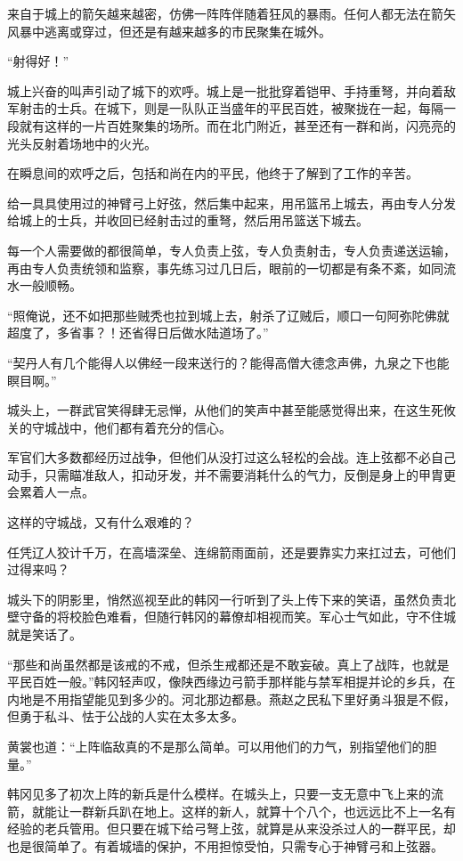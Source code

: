 来自于城上的箭矢越来越密，仿佛一阵阵伴随着狂风的暴雨。任何人都无法在箭矢风暴中逃离或穿过，但还是有越来越多的市民聚集在城外。

“射得好！”

城上兴奋的叫声引动了城下的欢呼。城上是一批批穿着铠甲、手持重弩，并向着敌军射击的士兵。在城下，则是一队队正当盛年的平民百姓，被聚拢在一起，每隔一段就有这样的一片百姓聚集的场所。而在北门附近，甚至还有一群和尚，闪亮亮的光头反射着场地中的火光。

在瞬息间的欢呼之后，包括和尚在内的平民，他终于了解到了工作的辛苦。

给一具具使用过的神臂弓上好弦，然后集中起来，用吊篮吊上城去，再由专人分发给城上的士兵，并收回已经射击过的重弩，然后用吊篮送下城去。

每一个人需要做的都很简单，专人负责上弦，专人负责射击，专人负责递送运输，再由专人负责统领和监察，事先练习过几日后，眼前的一切都是有条不紊，如同流水一般顺畅。

“照俺说，还不如把那些贼秃也拉到城上去，射杀了辽贼后，顺口一句阿弥陀佛就超度了，多省事？！还省得日后做水陆道场了。”

“契丹人有几个能得人以佛经一段来送行的？能得高僧大德念声佛，九泉之下也能瞑目啊。”

城头上，一群武官笑得肆无忌惮，从他们的笑声中甚至能感觉得出来，在这生死攸关的守城战中，他们都有着充分的信心。

军官们大多数都经历过战争，但他们从没打过这么轻松的会战。连上弦都不必自己动手，只需瞄准敌人，扣动牙发，并不需要消耗什么的气力，反倒是身上的甲胄更会累着人一点。

这样的守城战，又有什么艰难的？

任凭辽人狡计千万，在高墙深垒、连绵箭雨面前，还是要靠实力来扛过去，可他们过得来吗？

城头下的阴影里，悄然巡视至此的韩冈一行听到了头上传下来的笑语，虽然负责北壁守备的将校脸色难看，但随行韩冈的幕僚却相视而笑。军心士气如此，守不住城就是笑话了。

“那些和尚虽然都是该戒的不戒，但杀生戒都还是不敢妄破。真上了战阵，也就是平民百姓一般。”韩冈轻声叹，像陕西缘边弓箭手那样能与禁军相提并论的乡兵，在内地是不用指望能见到多少的。河北那边都悬。燕赵之民私下里好勇斗狠是不假，但勇于私斗、怯于公战的人实在太多太多。

黄裳也道：“上阵临敌真的不是那么简单。可以用他们的力气，别指望他们的胆量。”

韩冈见多了初次上阵的新兵是什么模样。在城头上，只要一支无意中飞上来的流箭，就能让一群新兵趴在地上。这样的新人，就算十个八个，也远远比不上一名有经验的老兵管用。但只要在城下给弓弩上弦，就算是从来没杀过人的一群平民，却也是很简单了。有着城墙的保护，不用担惊受怕，只需专心于神臂弓和上弦器。

